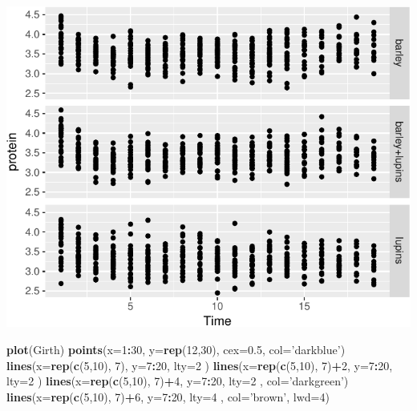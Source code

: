 \documentclass[]{book}
\newenvironment{Shaded}{\begin{snugshade}}{\end{snugshade}}
\newcommand{\KeywordTok}[1]{\textcolor[rgb]{0.13,0.29,0.53}{\textbf{#1}}}
\newcommand{\DataTypeTok}[1]{\textcolor[rgb]{0.13,0.29,0.53}{#1}}
\newcommand{\DecValTok}[1]{\textcolor[rgb]{0.00,0.00,0.81}{#1}}
\newcommand{\FloatTok}[1]{\textcolor[rgb]{0.00,0.00,0.81}{#1}}
\newcommand{\StringTok}[1]{\textcolor[rgb]{0.31,0.60,0.02}{#1}}
\newcommand{\OperatorTok}[1]{\textcolor[rgb]{0.81,0.36,0.00}{\textbf{#1}}}
\newcommand{\NormalTok}[1]{#1}
\theoremstyle{definition}
\theoremstyle{definition}
\theoremstyle{definition}
\theoremstyle{remark}
\begin{document}
\includegraphics[width=0.5\linewidth]{Rcourse_files/figure-latex/unnamed-chunk-246-1}

\begin{Shaded}
\begin{Highlighting}[]
\KeywordTok{plot}\NormalTok{(Girth)}
\KeywordTok{points}\NormalTok{(}\DataTypeTok{x=}\DecValTok{1}\OperatorTok{:}\DecValTok{30}\NormalTok{, }\DataTypeTok{y=}\KeywordTok{rep}\NormalTok{(}\DecValTok{12}\NormalTok{,}\DecValTok{30}\NormalTok{), }\DataTypeTok{cex=}\FloatTok{0.5}\NormalTok{, }\DataTypeTok{col=}\StringTok{'darkblue'}\NormalTok{)}
\KeywordTok{lines}\NormalTok{(}\DataTypeTok{x=}\KeywordTok{rep}\NormalTok{(}\KeywordTok{c}\NormalTok{(}\DecValTok{5}\NormalTok{,}\DecValTok{10}\NormalTok{), }\DecValTok{7}\NormalTok{), }\DataTypeTok{y=}\DecValTok{7}\OperatorTok{:}\DecValTok{20}\NormalTok{, }\DataTypeTok{lty=}\DecValTok{2}\NormalTok{ )}
\KeywordTok{lines}\NormalTok{(}\DataTypeTok{x=}\KeywordTok{rep}\NormalTok{(}\KeywordTok{c}\NormalTok{(}\DecValTok{5}\NormalTok{,}\DecValTok{10}\NormalTok{), }\DecValTok{7}\NormalTok{)}\OperatorTok{+}\DecValTok{2}\NormalTok{, }\DataTypeTok{y=}\DecValTok{7}\OperatorTok{:}\DecValTok{20}\NormalTok{, }\DataTypeTok{lty=}\DecValTok{2}\NormalTok{ )}
\KeywordTok{lines}\NormalTok{(}\DataTypeTok{x=}\KeywordTok{rep}\NormalTok{(}\KeywordTok{c}\NormalTok{(}\DecValTok{5}\NormalTok{,}\DecValTok{10}\NormalTok{), }\DecValTok{7}\NormalTok{)}\OperatorTok{+}\DecValTok{4}\NormalTok{, }\DataTypeTok{y=}\DecValTok{7}\OperatorTok{:}\DecValTok{20}\NormalTok{, }\DataTypeTok{lty=}\DecValTok{2}\NormalTok{ , }\DataTypeTok{col=}\StringTok{'darkgreen'}\NormalTok{)}
\KeywordTok{lines}\NormalTok{(}\DataTypeTok{x=}\KeywordTok{rep}\NormalTok{(}\KeywordTok{c}\NormalTok{(}\DecValTok{5}\NormalTok{,}\DecValTok{10}\NormalTok{), }\DecValTok{7}\NormalTok{)}\OperatorTok{+}\DecValTok{6}\NormalTok{, }\DataTypeTok{y=}\DecValTok{7}\OperatorTok{:}\DecValTok{20}\NormalTok{, }\DataTypeTok{lty=}\DecValTok{4}\NormalTok{ , }\DataTypeTok{col=}\StringTok{'brown'}\NormalTok{, }\DataTypeTok{lwd=}\DecValTok{4}\NormalTok{)}
\end{Highlighting}
\end{Shaded}
\end{document}
